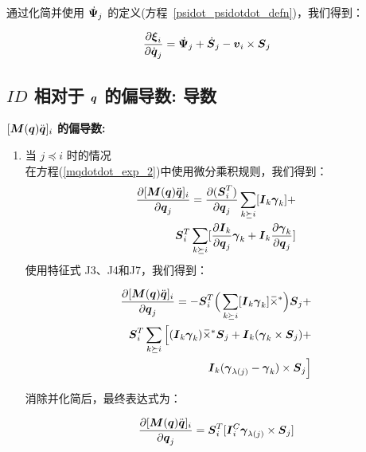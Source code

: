 \documentclass[letterpaper, 10 pt, conference]{ieeetran}  %
\begin{document}
{\begin{enumerate}
通过化简并使用 $\,\dot{\!\boldsymbol{\Psi}}_j$ 的定义(方程~\ref{psidot_psidotdot_defn})，我们得到：

\begin{equation}
    \frac{\partial \xibar_{i}}{\partial \dot{\q}_{j}} =  \Psibardot_{j}+ \Phibardot_{j} -\v_{i}\times \Phibar_{j} 
    \label{dxi_qdot_eq4}
\end{equation}

\end{enumerate}

\subsection{$ID$ 相对于 $\boldsymbol{q}$ 的偏导数: 导数}
\label{partials_details}
{\noindent \bf $[ \boldsymbol{M}(\boldsymbol{q}) \ddot{\boldsymbol{q}}]_{i}$ 的偏导数:}
\begin{enumerate}
  \item 当 $j \preceq i$ 时的情况\\
  在方程(\ref{mqdotdot_exp_2})中使用微分乘积规则，我们得到：
  \begin{equation}
      \begin{aligned}
        \frac{\partial [ \boldsymbol{M}(\boldsymbol{q}) \ddot{\boldsymbol{q}}]_{i}}{\partial \boldsymbol{q}_{j}} =  \frac{\partial (\boldsymbol{S}_{i}^{T})}{\partial \boldsymbol{q}_{j}} \sum_{k \succeq i} [\boldsymbol{I}{}_{k} \boldsymbol{\gamma}_{k}]   +  \\ 
        \boldsymbol{S}_{i}^{T}  \sum_{k \succeq i} [\frac{\partial \boldsymbol{I}{}_{k}}{\partial \boldsymbol{q}_{j}} \boldsymbol{\gamma}_{k} + \boldsymbol{I}{}_{k} \frac{\partial \boldsymbol{\gamma}_{k}}{\partial \boldsymbol{q}_{j}} ]  
      \end{aligned}
\end{equation}
 使用特征式 J3、J4和J7，我们得到：
  
   \begin{equation}
      \begin{aligned}
         \frac{\partial [ \boldsymbol{M}(\boldsymbol{q}) \ddot{\boldsymbol{q}}]_{i}}{\partial \boldsymbol{q}_{j}} =  -\boldsymbol{S}_{i}^{T} \Big(\sum_{k \succeq i} [\boldsymbol{I}{}_{k} \boldsymbol{\gamma}_{k}]  \,\overline{\!\times\!}{}^{\,*} \Big) \boldsymbol{S}_{j}  + \\
         \boldsymbol{S}_{i}^{T}  \sum_{k \succeq i} \Big[(\boldsymbol{I}{}_{k} \boldsymbol{\gamma}_{k}) \,\overline{\!\times\!}{}^{\,*} \boldsymbol{S}_{j} +  \boldsymbol{I}{}_{k}(\boldsymbol{\gamma}_{k} \times \boldsymbol{S}_{j})+\\ 
         \boldsymbol{I}{}_{k}  (\boldsymbol{\gamma}_{\lambda(j)} - \boldsymbol{\gamma}_{k} )  \times \boldsymbol{S}_{j} \Big]  
      \end{aligned}
\end{equation} 
  
\noindent 消除并化简后，最终表达式为：
 
   \begin{equation}
         \frac{\partial [ \M(\q) \qdd]_{i}}{\partial \q_{j}} =  \Phibar_{i}^{T} [  \I_{i}^{C}  \gammabar_{\lambda(j)}   \times \Phibar_{j} ]  
        \label{partial_Mqddot_3}
\end{equation}  


\end{enumerate}}
\end{document}
